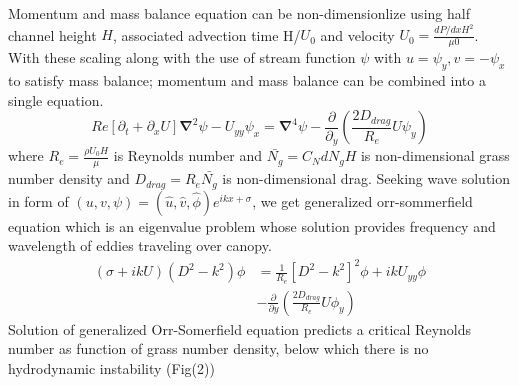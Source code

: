 \documentclass[aps,twocolumn,floatfix,prl,10pt]{revtex4-1}
\newcommand{\grad}{\mathbf{\nabla}}
\newcommand{\del}{\partial}
\begin{document}
Momentum and mass balance equation can be non-dimensionlize using half channel height $H$, associated advection time H/$U_0$ and velocity $U_0 = \frac{dP/dxH^2}{\mu0}$.
With these scaling along with the use of stream function $\psi$ with $u = \psi_{y}, v= -\psi_x$ to satisfy mass balance; momentum and mass balance can be combined 
into a single equation.
\begin{equation}
\scriptstyle{
Re\left[\del_t+\del_x U \right]\grad^2\psi - U_{yy}\psi_x = \grad^4\psi-\frac{\del}{\del_y}\left(\frac{2D_{drag}}{R_e}U\psi_y\right)
}
\end{equation}
where $R_{e}= \frac{\rho U_0 H}{\mu}$ is Reynolds number and $\bar{N_g} = C_N d N_g H$ is non-dimensional grass number density and  $D_{drag} = R_{e}\bar{N_{g}}$ is 
non-dimensional drag. Seeking wave solution in form of $\left(u,v,\psi \right)= \left(\hat u, \hat v, \hat\phi \right)e^{ikx+\sigma}$, we get generalized orr-sommerfield equation 
which is an eigenvalue problem whose solution provides frequency and wavelength of eddies traveling over canopy.
\begin{equation}
\begin{split}
\left(\sigma+ikU\right) \left(D^2-k^2\right)\phi &= \frac{1}{R_{e}}\left[D^2 -k^{2} \right]^2\phi +ikU_{yy}\phi \\
&-\frac{\del}{\del y}\left(\frac{2D_{drag}}{R_e}U\phi_y\right)
\end{split}
\end{equation}
Solution of generalized Orr-Somerfield equation predicts a critical Reynolds number as function of grass number density, below which there is no hydrodynamic instability (Fig(2))
\end{document}
